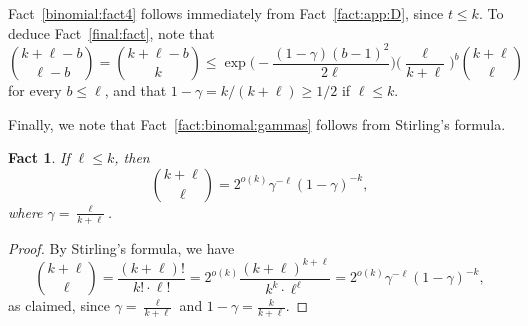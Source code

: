\documentclass[12pt,reqno]{amsart}
\newtheorem{fact}[theorem]{Fact}
\theoremstyle{definition}
\theoremstyle{remark}
\newcommand\N{\mathbb{N}}
\renewcommand{\le}{\leqslant}
\renewcommand{\ge}{\geqslant}
\def\N{\mathbb{N}}
\begin{document}
Fact~\ref{binomial:fact4} follows immediately from Fact~\ref{fact:app:D}, since $t \le k$. To deduce Fact~\ref{final:fact}, note that
$${k + \ell - b \choose \ell - b} = {k + \ell - b \choose k} \le \exp\bigg( - \frac{(1-\gamma) (b-1)^2}{2\ell} \bigg) \bigg( \frac{\ell}{k + \ell} \bigg)^b {k + \ell \choose \ell}$$
for every $b \le \ell$, and that $1 - \gamma = k/(k+\ell) \ge 1/2$ if $\ell \le k$.\smallskip

Finally, we note that Fact~\ref{fact:binomal:gammas} follows from Stirling's formula. 

\begin{fact}
If $\ell \le k$, then
$${k + \ell \choose \ell} = 2^{o(k)} \gamma^{-\ell} (1 - \gamma)^{-k},$$
where $\gamma = \frac{\ell}{k+\ell}$.
\end{fact}

\begin{proof}
By Stirling's formula, we have 
$${k + \ell \choose \ell} = \frac{(k+\ell)!}{k! \cdot \ell!} = %
2^{o(k)} \frac{(k+\ell)^{k+\ell}}{k^k \cdot \ell^\ell} = 2^{o(k)} \gamma^{-\ell} (1 - \gamma)^{-k},$$
as claimed, since $\gamma = \frac{\ell}{k+\ell}$ and $1 - \gamma = \frac{k}{k+\ell}$. 
\end{proof}
\end{document}
